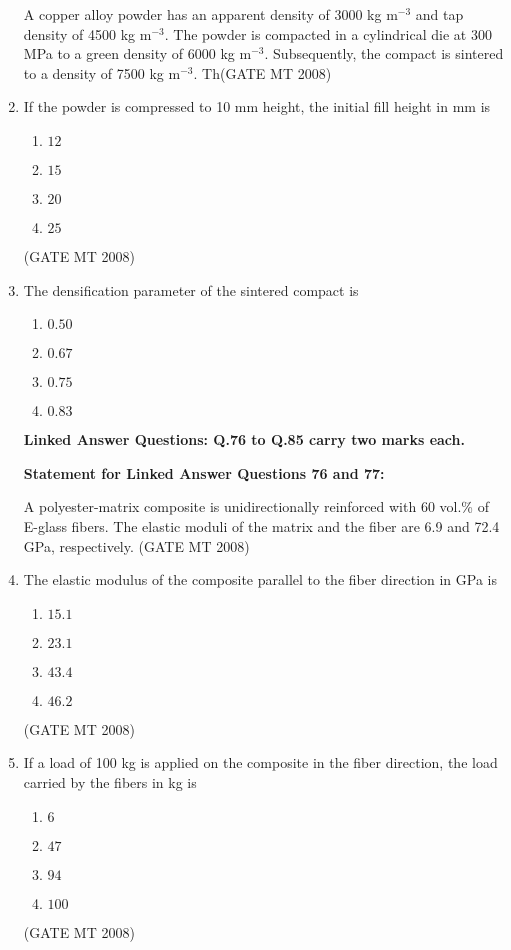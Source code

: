 \documentclass[11pt, letterpaper]{article}
\theoremstyle{remark}
\begin{document}
\begin{enumerate}
A copper alloy powder has an apparent density of 3000 kg m$^{-3}$ and tap density of 4500 kg m$^{-3}$. 
The powder is compacted in a cylindrical die at 300 MPa to a green density of 6000 kg m$^{-3}$. 
Subsequently, the compact is sintered to a density of 7500 kg m$^{-3}$. 
Th(GATE MT 2008)
\item If the powder is compressed to 10 mm height, the initial fill height in mm is
\begin{multicols}{4}
\begin{enumerate} 
\item $12$
\item $15$
\item $20$
\item $25$
\end{enumerate}
\end{multicols}
\hfill(GATE MT 2008)
\item The densification parameter of the sintered compact is
\begin{multicols}{4}
\begin{enumerate} 
\item $0.50$
\item $0.67$
\item $0.75$
\item $0.83$
\end{enumerate}
\end{multicols}


\textbf{Linked Answer Questions: Q.76 to Q.85 carry two marks each.}

\textbf{Statement for Linked Answer Questions 76 and 77:}

A polyester-matrix composite is unidirectionally reinforced with 60 vol.\% of E-glass fibers. 
The elastic moduli of the matrix and the fiber are 6.9 and 72.4 GPa, respectively.
\hfill(GATE MT 2008)
\item The elastic modulus of the composite parallel to the fiber direction in GPa is
\begin{multicols}{4}
\begin{enumerate} 
\item $15.1$
\item $23.1$
\item $43.4$
\item $46.2$
\end{enumerate}
\end{multicols}
\hfill(GATE MT 2008)
\item If a load of 100 kg is applied on the composite in the fiber direction, the load carried by the fibers in kg is
\begin{multicols}{4}
\begin{enumerate} 
\item $6$
\item $47$
\item $94$
\item $100$
\end{enumerate}
\end{multicols}
\hfill(GATE MT 2008)



\end{enumerate}
\end{document}
